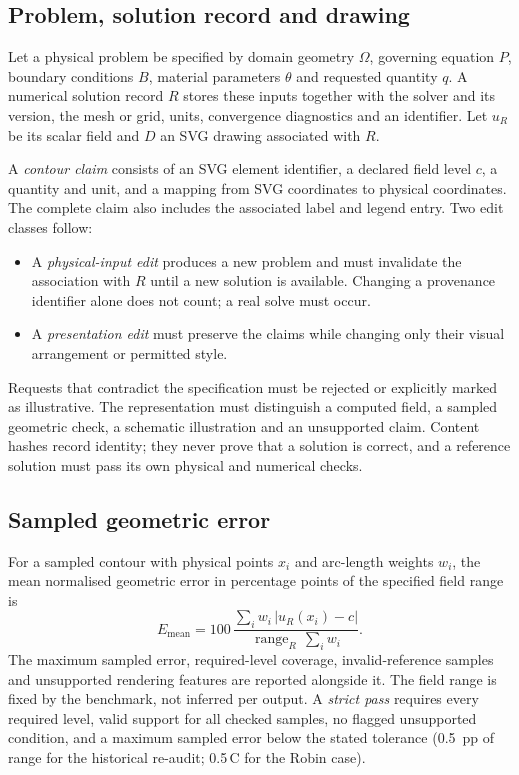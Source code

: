 \documentclass[11pt,a4paper]{article}
\newcommand{\degC}{\,\textdegree C}
\begin{document}
\subsection{Problem, solution record and drawing}

Let a physical problem be specified by domain geometry $\Omega$, governing equation $P$, boundary conditions $B$, material parameters $\theta$ and requested quantity $q$. A numerical solution record $R$ stores these inputs together with the solver and its version, the mesh or grid, units, convergence diagnostics and an identifier. Let $u_R$ be its scalar field and $D$ an SVG drawing associated with $R$.

A \emph{contour claim} consists of an SVG element identifier, a declared field level $c$, a quantity and unit, and a mapping from SVG coordinates to physical coordinates. The complete claim also includes the associated label and legend entry. Two edit classes follow:
\begin{itemize}
  \item A \emph{physical-input edit} produces a new problem and must invalidate the association with $R$ until a new solution is available. Changing a provenance identifier alone does not count; a real solve must occur.
  \item A \emph{presentation edit} must preserve the claims while changing only their visual arrangement or permitted style.
\end{itemize}
Requests that contradict the specification must be rejected or explicitly marked as illustrative. The representation must distinguish a computed field, a sampled geometric check, a schematic illustration and an unsupported claim. Content hashes record identity; they never prove that a solution is correct, and a reference solution must pass its own physical and numerical checks.

\subsection{Sampled geometric error}

For a sampled contour with physical points $x_i$ and arc-length weights $w_i$, the mean normalised geometric error in percentage points of the specified field range is
\begin{equation}
E_{\mathrm{mean}} = 100\,\frac{\sum_i w_i\,\lvert u_R(x_i)-c\rvert}{\operatorname{range}_R\,\sum_i w_i}.
\end{equation}
The maximum sampled error, required-level coverage, invalid-reference samples and unsupported rendering features are reported alongside it. The field range is fixed by the benchmark, not inferred per output. A \emph{strict pass} requires every required level, valid support for all checked samples, no flagged unsupported condition, and a maximum sampled error below the stated tolerance (0.5~pp of range for the historical re-audit; 0.5\degC{} for the Robin case).
\end{document}
